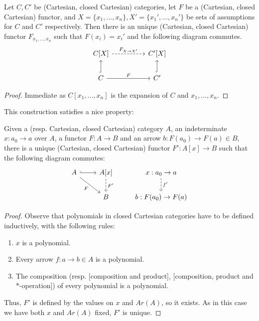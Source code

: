 \begin{proposition}\label{unique-polynomial-functor}Let $C,C'$ be (Cartesian, closed Cartesian) categories, let $F$ be a (Cartesian, closed Cartesian) functor, and $X=\{x_1,...,x_n\}, X'=\{x_1',...,x_n'\}$ be sets of assumptions for $C$ and $C'$ respectively. Then there is an unique (Cartesian, closed Cartesian) functor $F_{x_1,...,x_n}$ such that $F(x_i)=x_i'$ and the following diagram commutes. 
  \[
    \begin{tikzcd}
      C[X]\arrow[dashed]{rr}{F_{X\to X'}}&& C'[X]\\
      C \arrow{rr}{F}\arrow[hookrightarrow]{u}{}&& C'\arrow[hookrightarrow]{u}{}
    \end{tikzcd}
  \]
\end{proposition}
\begin{proof}
  Immediate as $C[x_1,...,x_n]$ is the expansion of $C$ and ${x_1,...,x_n}$.
\end{proof}

This construction satisfies a nice property:

\begin{proposition}\label{univ-polynomial}
  Given a (resp. Cartesian, closed Cartesian) category $A$, an indeterminate $x:a_0\to a$ over $A$, a functor $F:A\to B$ and an arrow $ b:F(a_0) \to F(a) \in B$, there is a unique (Cartesian, closed Cartesian) functor $F': A[x]\to B$ such that the following diagram commutes:
  \[
    \begin{tikzcd}
      A\arrow[hookrightarrow]{r}{} \arrow[rd, "F", swap]      & A[x] \arrow[d, "F'", dashed]& x:a_0\to a\arrow[d,"f'",dashed]\\
      &B& b:F(a_0)\to F(a) 
    \end{tikzcd}
  \]
\end{proposition}
\begin{proof}
  Observe that polynomials in closed Cartesian categories have to be defined inductively, with the following rules:
  \begin{enumerate}
  \item $x$ is a polynomial.
  \item Every arrow $f:a \to b\in A$ is a polynomial.
  \item The composition (resp.  [composition and product],  [composition, product and $*$-operation]) of every polynomial is a polynomial.
  \end{enumerate}
  Thus, $F'$ is defined by the values on $x$ and $Ar(A)$, so it exists. As in this case we have both  $x$ and $Ar(A)$ fixed, $F'$ is unique. 
\end{proof}


